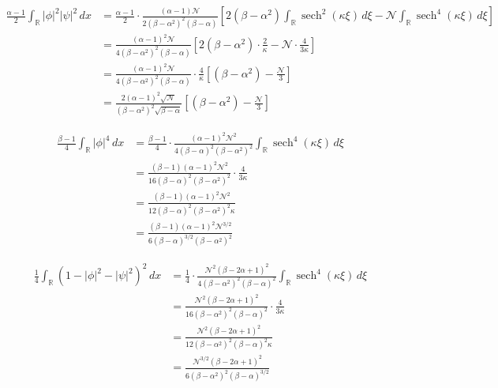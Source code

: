 \documentclass[letterpaper,11pt]{exam}
\theoremstyle{plain}
\begin{document}
\begin{align*}
\frac{\alpha-1}{2}\int_{\mathbb{R}}|\phi|^2|\psi|^2\,dx &= \frac{\alpha-1}{2}\cdot\frac{(\alpha-1)\mathcal{N}}{2(\beta-\alpha^2)^2(\beta-\alpha)}\left[2(\beta-\alpha^2)\int_{\mathbb{R}}\operatorname{sech}^2(\kappa\xi)\,d\xi - \mathcal{N}\int_{\mathbb{R}}\operatorname{sech}^4(\kappa\xi)\,d\xi\right]\\[8pt]
&= \frac{(\alpha-1)^2\mathcal{N}}{4(\beta-\alpha^2)^2(\beta-\alpha)}\left[2(\beta-\alpha^2)\cdot\frac{2}{\kappa} - \mathcal{N}\cdot\frac{4}{3\kappa}\right]\\[8pt]
&= \frac{(\alpha-1)^2\mathcal{N}}{4(\beta-\alpha^2)^2(\beta-\alpha)}\cdot\frac{4}{\kappa}\left[(\beta-\alpha^2) - \frac{\mathcal{N}}{3}\right]\\[8pt]
&= \frac{2(\alpha-1)^2\sqrt{\mathcal{N}}}{(\beta-\alpha^2)^2\sqrt{\beta-\alpha}}\left[(\beta-\alpha^2)-\frac{\mathcal{N}}{3}\right]
\end{align*}

\begin{align*}
\frac{\beta-1}{4}\int_{\mathbb{R}}|\phi|^4\,dx &= \frac{\beta-1}{4}\cdot\frac{(\alpha-1)^2\mathcal{N}^2}{4(\beta-\alpha)^2(\beta-\alpha^2)^2}\int_{\mathbb{R}}\operatorname{sech}^4(\kappa\xi)\,d\xi\\[8pt]
&= \frac{(\beta-1)(\alpha-1)^2\mathcal{N}^2}{16(\beta-\alpha)^2(\beta-\alpha^2)^2}\cdot\frac{4}{3\kappa}\\[8pt]
&= \frac{(\beta-1)(\alpha-1)^2\mathcal{N}^2}{12(\beta-\alpha)^2(\beta-\alpha^2)^2\kappa}\\[8pt]
&= \frac{(\beta-1)(\alpha-1)^2\mathcal{N}^{3/2}}{6(\beta-\alpha)^{3/2}(\beta-\alpha^2)^2}
\end{align*}

\begin{align*}
\frac{1}{4}\int_{\mathbb{R}}\left(1-|\phi|^2-|\psi|^2\right)^2\,dx &= \frac{1}{4}\cdot\frac{\mathcal{N}^2(\beta-2\alpha+1)^2}{4(\beta-\alpha^2)^2(\beta-\alpha)^2}\int_{\mathbb{R}}\operatorname{sech}^4(\kappa\xi)\,d\xi\\[8pt]
&= \frac{\mathcal{N}^2(\beta-2\alpha+1)^2}{16(\beta-\alpha^2)^2(\beta-\alpha)^2}\cdot\frac{4}{3\kappa}\\[8pt]
&= \frac{\mathcal{N}^2(\beta-2\alpha+1)^2}{12(\beta-\alpha^2)^2(\beta-\alpha)^2\kappa}\\[8pt]
&= \frac{\mathcal{N}^{3/2}(\beta-2\alpha+1)^2}{6(\beta-\alpha^2)^2(\beta-\alpha)^{3/2}}
\end{align*}
\end{document}
